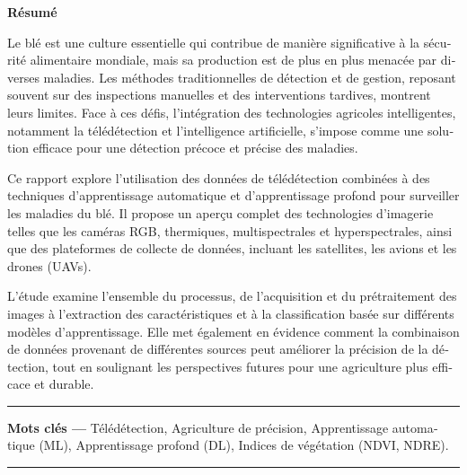 \begin{otherlanguage}{french}
    \thispagestyle{plain}
    \setcounter{page}{3}

    \noindent
    {\Large\bfseries Résumé}

    \noindent
    Le blé est une culture essentielle qui contribue de manière significative à la sécurité alimentaire mondiale, mais sa production est de plus en plus menacée par diverses maladies. Les méthodes traditionnelles de détection et de gestion, reposant souvent sur des inspections manuelles et des interventions tardives, montrent leurs limites. Face à ces défis, l’intégration des technologies agricoles intelligentes, notamment la télédétection et l’intelligence artificielle, s’impose comme une solution efficace pour une détection précoce et précise des maladies.

    Ce rapport explore l’utilisation des données de télédétection combinées à des techniques d’apprentissage automatique et d’apprentissage profond pour surveiller les maladies du blé. Il propose un aperçu complet des technologies d’imagerie telles que les caméras RGB, thermiques, multispectrales et hyperspectrales, ainsi que des plateformes de collecte de données, incluant les satellites, les avions et les drones (UAVs).

    L’étude examine l’ensemble du processus, de l’acquisition et du prétraitement des images à l’extraction des caractéristiques et à la classification basée sur différents modèles d’apprentissage. Elle met également en évidence comment la combinaison de données provenant de différentes sources peut améliorer la précision de la détection, tout en soulignant les perspectives futures pour une agriculture plus efficace et durable.

    \vspace{1cm}
    \noindent\rule{\linewidth}{1pt}
    \noindent
    \textbf{Mots clés --- } Télédétection, Agriculture de précision, Apprentissage automatique (ML), Apprentissage profond (DL), Indices de végétation (NDVI, NDRE).\\
    \noindent\rule{\linewidth}{1pt}
\end{otherlanguage}

\newpage



